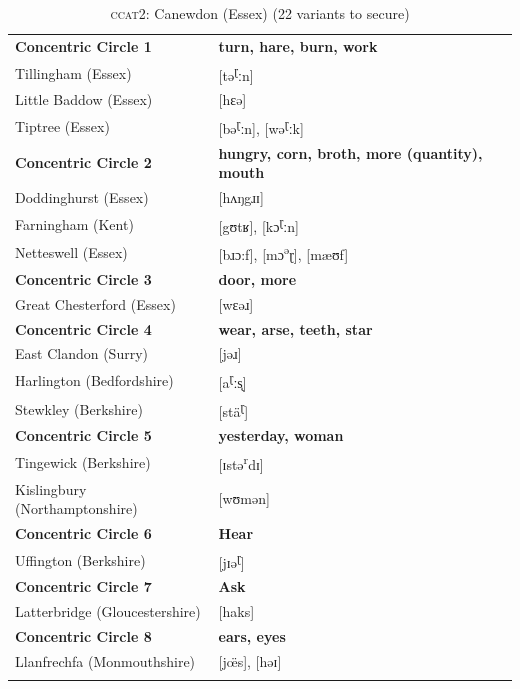 \begin{table}
\begin{tabularx}{\textwidth}{lQ}
\lsptoprule 
\textbf{Concentric Circle 1} & \textbf{turn, hare, burn, work} \\  
Tillingham (Essex) & [tə\textsuperscript{ɽ}ːn] \\
Little Baddow (Essex) &  [hɛə] \\
Tiptree (Essex) & [bə\textsuperscript{ɽ}ːn], [wə\textsuperscript{ɽ}ːk]  \\
\midrule
\textbf{Concentric Circle 2} & \textbf{hungry, corn, broth, more (quantity), mouth} \\
Doddinghurst (Essex) & [hʌŋgɹɪ]  \\
Farningham (Kent) &  [gʊtʁ], [kɔ\textsuperscript{ɽ}ːn]\\
Netteswell (Essex) &  [bɹɔ:f], [mɔ\textsuperscript{ə}ɽ], [mæʊf] \\
\midrule
\textbf{Concentric Circle 3} & \textbf{door, more}\\
Great Chesterford (Essex) & [wɛəɹ] \\
\midrule
\textbf{Concentric Circle 4} & \textbf{wear, arse, teeth, star}\\
East Clandon (Surry) & [jəɹ] \\
Harlington (Bedfordshire) & [a\textsuperscript{ɽ}ːs̨] \\
Stewkley (Berkshire) & [stä\textsuperscript{ɽ}] \\
\midrule
\textbf{Concentric Circle 5} & \textbf{yesterday, woman}\\
Tingewick (Berkshire) & [ɪstə\textsuperscript{r}dɪ]  \\
Kislingbury (Northamptonshire) & [wʊmən] \\
\midrule
\textbf{Concentric Circle 6} & \textbf{Hear}\\
Uffington (Berkshire) &  [jɪə\textsuperscript{ɽ}]\\
\midrule
\textbf{Concentric Circle 7} & \textbf{Ask}\\
Latterbridge (Gloucestershire) & [haks]\\
\midrule
\textbf{Concentric Circle 8} & \textbf{ears, eyes}\\
Llanfrechfa (Monmouthshire) &  [j\"œs],  [həɪ]  \\
\lspbottomrule 
\end{tabularx}
\caption{\textsc{ccat2}: Canewdon (Essex)  (22 variants to secure)}
\label{Table 5.3}
\end{table}

